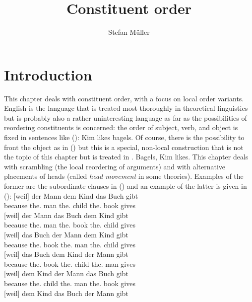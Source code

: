 \documentclass[output=paper
                ,modfonts
                ,nonflat
	        ,collection
	        ,collectionchapter
	        ,collectiontoclongg
 	        ,biblatex
                ,babelshorthands
                ,newtxmath
                ,draftmode
                ,colorlinks, citecolor=brown
]{./langsci/langscibook}
\author{%
	Stefan Müller\affiliation{Humboldt-Universität zu Berlin}%
}
\title{Constituent order}
\begin{document}
\maketitle
\label{chap-order}

\section{Introduction} 

This chapter deals with constituent order, with a focus on local order variants. English is the
language that is treated most thoroughly in theoretical linguistics but is probably also a rather uninteresting
language as far as the possibilities of reordering constituents is concerned: the order of subject,
verb, and object is fixed in sentences like ():
\ea
Kim likes bagels.
\z
Of course, there is the possibility to front the object as in () but this is a special,
non-local construction that is not the topic of this chapter but is treated in .
\ea
Bagels, Kim likes.
\z
This chapter deals with scrambling (the local reordering of arguments) and with alternative
placements of heads (called \emph{head movement} in some theories). Examples of the former are the
subordinate clauses in () and an example of the latter is given in ():
\eal
\label{ex-permutation-mf}
\ex 
\gll {}[weil]          der Mann dem Kind das Buch gibt\\
     \spacebr{}because the.\NOM{} man the.\DAT{} child the.\ACC{} book gives\\
\ex 
\gll {}[weil]          der Mann das Buch dem Kind  gibt\\
     \spacebr{}because the.\NOM{} man  the.\ACC{} book the.\DAT{} child gives\\
\ex 
\gll {}[weil]          das Buch der Mann dem Kind  gibt\\
     \spacebr{}because the.\ACC{} book the.\NOM{} man  the.\DAT{} child gives\\
\ex 
\gll {}[weil]          das Buch dem Kind  der Mann gibt\\
     \spacebr{}because the.\ACC{} book the.\DAT{} child the.\NOM{} man  gives\\
\ex 
\gll {}[weil]          dem Kind  der Mann das Buch gibt\\
     \spacebr{}because the.\DAT{} child the.\NOM{} man  the.\ACC{} book gives\\
\ex 
\gll {}[weil]          dem Kind  das Buch der Mann gibt\\
\end{document}
